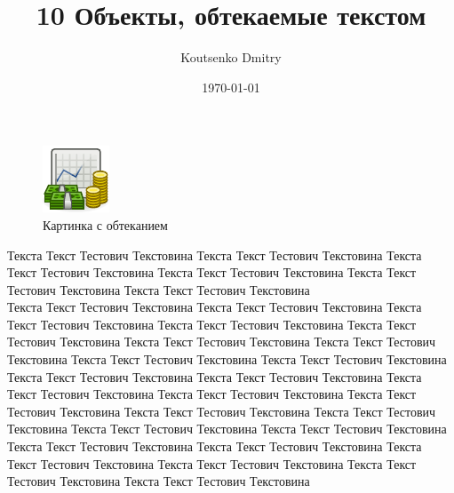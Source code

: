 \documentclass[a4paper,12pt]{article}                       %
\title{10 Объекты, обтекаемые текстом}
\author{Koutsenko Dmitry}
\date{\today}
\begin{document}

\maketitle

\begin{figure}
    \includegraphics[width=\linewidth]{images/7-image.pdf}
    \caption{Картинка с обтеканием}
\end{figure}
Текста Текст Тестович Текстовина Текста Текст Тестович Текстовина Текста Текст Тестович Текстовина Текста Текст Тестович Текстовина Текста Текст Тестович Текстовина Текста Текст Тестович Текстовина \\

Текста Текст Тестович Текстовина Текста Текст Тестович Текстовина Текста Текст Тестович Текстовина Текста Текст Тестович Текстовина Текста Текст Тестович Текстовина Текста Текст Тестович Текстовина Текста Текст Тестович Текстовина Текста Текст Тестович Текстовина Текста Текст Тестович Текстовина Текста Текст Тестович Текстовина Текста Текст Тестович Текстовина Текста Текст Тестович Текстовина Текста Текст Тестович Текстовина Текста Текст Тестович Текстовина Текста Текст Тестович Текстовина Текста Текст Тестович Текстовина Текста Текст Тестович Текстовина Текста Текст Тестович Текстовина Текста Текст Тестович Текстовина Текста Текст Тестович Текстовина Текста Текст Тестович Текстовина Текста Текст Тестович Текстовина Текста Текст Тестович Текстовина Текста Текст Тестович Текстовина \\
\end{document}
